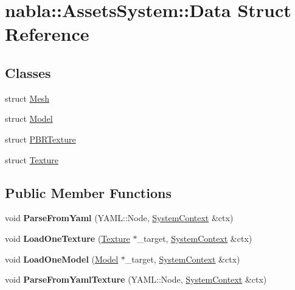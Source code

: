 \hypertarget{structnabla_1_1_assets_system_1_1_data}{}\section{nabla\+::Assets\+System\+::Data Struct Reference}
\label{structnabla_1_1_assets_system_1_1_data}
\subsection*{Classes}
\begin{DoxyCompactItemize}
\item 
struct \mbox{\hyperlink{structnabla_1_1_assets_system_1_1_data_1_1_mesh}{Mesh}}
\item 
struct \mbox{\hyperlink{structnabla_1_1_assets_system_1_1_data_1_1_model}{Model}}
\item 
struct \mbox{\hyperlink{structnabla_1_1_assets_system_1_1_data_1_1_p_b_r_texture}{P\+B\+R\+Texture}}
\item 
struct \mbox{\hyperlink{structnabla_1_1_assets_system_1_1_data_1_1_texture}{Texture}}
\end{DoxyCompactItemize}
\subsection*{Public Member Functions}
\begin{DoxyCompactItemize}
\item 
\mbox{\label{structnabla_1_1_assets_system_1_1_data_af5846b44df3b049afa724e3d7acd9efb}} 
void {\bfseries Parse\+From\+Yaml} (Y\+A\+M\+L\+::\+Node, \mbox{\hyperlink{structnabla_1_1_system_context}{System\+Context}} \&ctx)
\item 
\mbox{\label{structnabla_1_1_assets_system_1_1_data_a2a9cd41240cd947ddbb9030b91ad9870}} 
void {\bfseries Load\+One\+Texture} (\mbox{\hyperlink{structnabla_1_1_assets_system_1_1_data_1_1_texture}{Texture}} $\ast$\+\_\+target, \mbox{\hyperlink{structnabla_1_1_system_context}{System\+Context}} \&ctx)
\item 
\mbox{\label{structnabla_1_1_assets_system_1_1_data_a7cc68674f93d26f0e5ec9f9e773069bd}} 
void {\bfseries Load\+One\+Model} (\mbox{\hyperlink{structnabla_1_1_assets_system_1_1_data_1_1_model}{Model}} $\ast$\+\_\+target, \mbox{\hyperlink{structnabla_1_1_system_context}{System\+Context}} \&ctx)
\item 
\mbox{\label{structnabla_1_1_assets_system_1_1_data_aae1510ee04cdcb26a77699939f2b417c}} 
void {\bfseries Parse\+From\+Yaml\+Texture} (Y\+A\+M\+L\+::\+Node, \mbox{\hyperlink{structnabla_1_1_system_context}{System\+Context}} \&ctx)
\end{DoxyCompactItemize}
